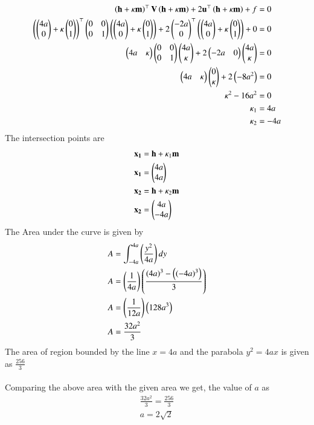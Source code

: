 \documentclass[journal]{IEEEtran}
\begin{document}
\begin{align}
\left(\mathbf{h}+\kappa\mathbf{m}\right)^\top\mathbf{V}\left(\mathbf{h}+\kappa\mathbf{m}\right) + 2\mathbf{u}^\top\left(\mathbf{h}+\kappa\mathbf{m}\right) + f &= 0\\
\left(\begin{pmatrix}4a\\0\end{pmatrix}+\kappa\begin{pmatrix}0\\1\end{pmatrix}\right)^\top\begin{pmatrix}0 & 0\\0 & 1\end{pmatrix}\left(\begin{pmatrix}4a\\0\end{pmatrix}+\kappa\begin{pmatrix}0\\1\end{pmatrix}\right) + 2\begin{pmatrix}-2a\\0\end{pmatrix}^\top\left(\begin{pmatrix}4a\\0\end{pmatrix}+\kappa\begin{pmatrix}0\\1\end{pmatrix}\right) + 0 &= 0\\
\begin{pmatrix}4a&\kappa\end{pmatrix}\begin{pmatrix}0&0\\0&1\end{pmatrix}\begin{pmatrix}4a\\\kappa\end{pmatrix}+2\begin{pmatrix}-2a&0\end{pmatrix}\begin{pmatrix}4a\\\kappa\end{pmatrix} &= 0\\
\begin{pmatrix}4a&\kappa\end{pmatrix}\begin{pmatrix}0\\\kappa\end{pmatrix}+2\left(-8a^2\right) &= 0\\
\kappa^2-16a^2&= 0\\
\kappa_1&=4a\\
\kappa_2&=-4a\\
\end{align}
The intersection points are
\begin{align}
\mathbf{x_1} &= \mathbf{h}+\kappa_1\mathbf{m}\\
\mathbf{x_1} &= \begin{pmatrix}4a\\4a\end{pmatrix}\\
\mathbf{x_2} &= \mathbf{h}+\kappa_2\mathbf{m}\\
\mathbf{x_2} &= \begin{pmatrix}4a\\-4a\end{pmatrix}
\end{align}
The Area under the curve is given by
\begin{align}
A &= \int_{-4a}^{4a}\left(\frac{y^2}{4a}\right)dy\\
A &= \left(\frac{1}{4a}\right)\left(\frac{(4a)^3 - \left((-4a)^3\right)}{3}\right)\\
A &= \left(\frac{1}{12a}\right)\left(128a^3\right)\\
A &= \frac{32a^2}{3}
\end{align}
The area of region bounded by the line $x=4a$ and the parabola $y^2=4ax$ is given as $\frac{256}{3}$ \\ \\
Comparing the above area with the given area we get, the value of $a$ as  \\
\begin{align}
    \frac{32a^2}{3} = \frac{256}{3} \\ 
    a = 2\sqrt{2}
\end{align}
\end{document}
